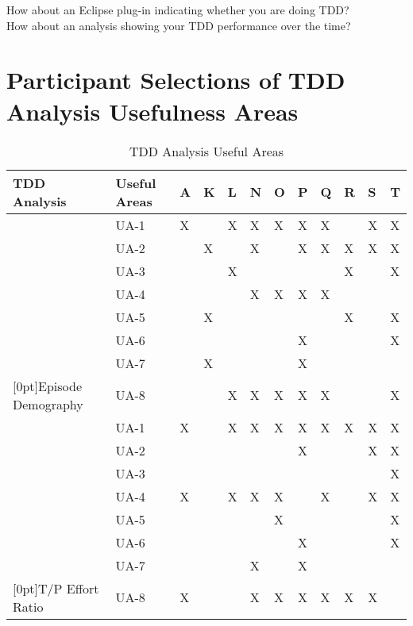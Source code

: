 \begin{enumerate}
  How about an Eclipse plug-in indicating whether you are doing TDD? \\
  How about an analysis showing your TDD performance over the time? \\
\end{enumerate}

\chapter{Participant Selections of TDD Analysis Usefulness Areas}
\label{app:UsefulnessAreas}
\begin{table}[!htbp]
\centering
  \caption{TDD Analysis Useful Areas}\label{tab:UsefulnessArea}  
  \begin{tabular}{|l|l|l|l|l|l|l|l|l|l|l|l|}
  \hline 
TDD Analysis   &   Useful Areas    &  A	&  K	&  L	&  N	&  O	&  P	&  Q	&  R	&  S	&  T  \\ \hline
    &  UA-1 &  X  &     &  X  &  X  &  X  &  X  &  X  &     &  X  &  X  \\ \cline{2-12}
    &  UA-2 &     &  X  &     &  X  &     &  X  &  X  &  X  &  X  &  X  \\ \cline{2-12}
    &  UA-3 &     &     &  X  &     &     &     &     &  X  &     &  X  \\ \cline{2-12}
    &  UA-4 &     &     &     &  X  &  X  &  X  &  X  &     &     &     \\ \cline{2-12}
    &  UA-5 &     &  X  &     &     &     &     &     &  X  &     &  X  \\ \cline{2-12}
    &  UA-6 &     &     &     &     &     &  X  &     &     &     &  X  \\ \cline{2-12}
    &  UA-7 &     &  X  &     &     &     &  X  &     &     &     &     \\ \cline{2-12}
\raisebox{10ex}[0pt]{Episode Demography}     
    &  UA-8 &     &     &  X  &  X  &  X  &  X  &  X  &     &     &  X  \\ \hline
    
    &  UA-1 &  X  &     &  X  &  X  &  X  &  X  &  X  &  X  &  X  &  X  \\ \cline{2-12} 
    &  UA-2 &     &     &     &     &     &  X  &     &     &  X  &  X  \\ \cline{2-12} 
    &  UA-3 &     &     &     &     &     &     &     &     &     &  X  \\ \cline{2-12} 
    &  UA-4 &  X  &     &  X  &  X  &  X  &     &  X  &     &  X  &  X  \\ \cline{2-12} 
    &  UA-5 &     &     &     &     &  X  &     &     &     &     &  X  \\ \cline{2-12}  
    &  UA-6 &     &     &     &     &     &  X  &     &     &     &  X  \\ \cline{2-12} 
    &  UA-7 &     &     &     &  X  &     &  X  &     &     &     &     \\ \cline{2-12} 
\raisebox{10ex}[0pt]{T/P Effort Ratio}  
    &  UA-8 &  X  &     &     &  X  &  X  &  X  &  X  &  X  &  X  &     \\ \hline


\end{tabular}
\end{table}
